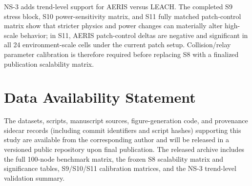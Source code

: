 \documentclass[sensors,article,submit,moreauthors,pdftex]{Definitions/mdpi}
\begin{document}
NS-3 adds trend-level support for AERIS versus LEACH. The completed S9 stress block, S10 power-sensitivity matrix, and S11 fully matched patch-control matrix show that stricter physics and power changes can materially alter high-scale behavior; in S11, AERIS patch-control deltas are negative and significant in all 24 environment-scale cells under the current patch setup. Collision/relay parameter calibration is therefore required before replacing S8 with a finalized publication scalability matrix.

\section*{Data Availability Statement}
The datasets, scripts, manuscript sources, figure-generation code, and provenance sidecar records (including commit identifiers and script hashes) supporting this study are available from the corresponding author and will be released in a versioned public repository upon final publication. The released archive includes the full 100-node benchmark matrix, the frozen S8 scalability matrix and significance tables, S9/S10/S11 calibration matrices, and the NS-3 trend-level validation summary.


\end{document}
